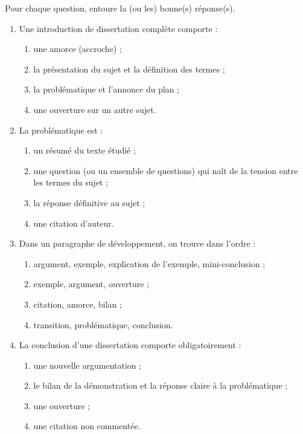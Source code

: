 \documentclass[11pt]{article}
\begin{document}
\begin{exercice}
Pour chaque question, entoure la (ou les) bonne(s) réponse(s).
\begin{enumerate}
\item Une introduction de dissertation complète comporte :
\begin{enumerate}
\item une amorce (accroche) ;
\item la présentation du sujet et la définition des termes ;
\item la problématique et l'annonce du plan ;
\item une ouverture sur un autre sujet.
\end{enumerate}
\item La problématique est :
\begin{enumerate}
\item un résumé du texte étudié ;
\item une question (ou un ensemble de questions) qui naît de la tension entre les termes du sujet ;
\item la réponse définitive au sujet ;
\item une citation d'auteur.
\end{enumerate}
\item Dans un paragraphe de développement, on trouve dans l'ordre :
\begin{enumerate}
\item argument, exemple, explication de l'exemple, mini-conclusion ;
\item exemple, argument, ouverture ;
\item citation, amorce, bilan ;
\item transition, problématique, conclusion.
\end{enumerate}
\item La conclusion d'une dissertation comporte obligatoirement :
\begin{enumerate}
\item une nouvelle argumentation ;
\item le bilan de la démonstration et la réponse claire à la problématique ;
\item une ouverture ;
\item une citation non commentée.
\end{enumerate}
\end{enumerate}
\end{exercice}
\end{document}
